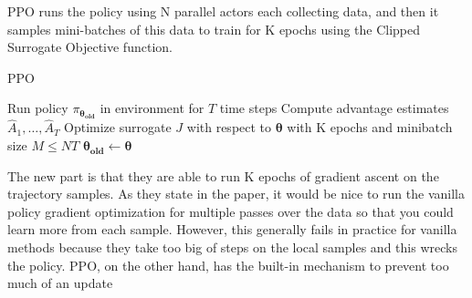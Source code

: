 PPO runs the policy using N parallel actors each collecting data, and then it samples mini-batches of this data to train for K epochs using the Clipped Surrogate Objective function.

\begin{algorithm}
	\caption{PPO}\label{PPO}
	\begin{algorithmic}[1]
				\State Run policy $\pi_{\bm{\theta_{old}}}$ in environment for $T$ time steps
				\State Compute advantage estimates $\hat{A}_1,\dots,\hat{A}_T$
			\EndFor
		\State Optimize surrogate $J$ with respect to $\bm{\theta}$ with K epochs and minibatch size $M \leq NT$
		\State $\bm{\theta_{old}} \gets \bm{\theta}$
		\EndFor
		\EndProcedure
	\end{algorithmic}
\end{algorithm}

The new part is that they are able to run K epochs of gradient ascent on the trajectory samples. As they state in the paper, it would be nice to run the vanilla policy gradient optimization for multiple passes over the data so that you could learn more from each sample. However, this generally fails in practice for vanilla methods because they take too big of steps on the local samples and this wrecks the policy. PPO, on the other hand, has the built-in mechanism to prevent too much of an update


 
 
 











